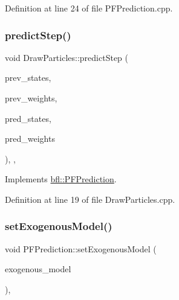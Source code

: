 Definition at line 24 of file P\+F\+Prediction.\+cpp.

\mbox{\label{classbfl_1_1DrawParticles_a7a50d50c32b155fc22bc2edafe991dcd}} 
\subsubsection{\texorpdfstring{predict\+Step()}{predictStep()}}
{\footnotesize\ttfamily void Draw\+Particles\+::predict\+Step (\begin{DoxyParamCaption}\item[{const Eigen\+::\+Ref$<$ const Eigen\+::\+Matrix\+Xf $>$ \&}]{prev\+\_\+states,  }\item[{const Eigen\+::\+Ref$<$ const Eigen\+::\+Vector\+Xf $>$ \&}]{prev\+\_\+weights,  }\item[{Eigen\+::\+Ref$<$ Eigen\+::\+Matrix\+Xf $>$}]{pred\+\_\+states,  }\item[{Eigen\+::\+Ref$<$ Eigen\+::\+Vector\+Xf $>$}]{pred\+\_\+weights }\end{DoxyParamCaption})\hspace{0.3cm}{\ttfamily [override]}, {\ttfamily [protected]}, {\ttfamily [virtual]}}



Implements \mbox{\hyperlink{classbfl_1_1PFPrediction_a2488a3f3bf2345b4723d96cd7fda5491}{bfl\+::\+P\+F\+Prediction}}.



Definition at line 19 of file Draw\+Particles.\+cpp.

\mbox{\label{classbfl_1_1PFPrediction_ada843698204584e97d4ff6728c8e8264}} 
\subsubsection{\texorpdfstring{set\+Exogenous\+Model()}{setExogenousModel()}}
{\footnotesize\ttfamily void P\+F\+Prediction\+::set\+Exogenous\+Model (\begin{DoxyParamCaption}\item[{std\+::unique\+\_\+ptr$<$ \mbox{\hyperlink{classbfl_1_1ExogenousModel}{Exogenous\+Model}} $>$}]{exogenous\+\_\+model }\end{DoxyParamCaption})\hspace{0.3cm}{\ttfamily [virtual]}, {\ttfamily [inherited]}}



